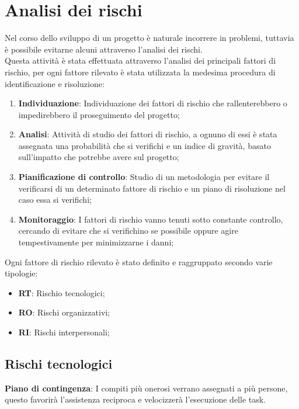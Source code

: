 \section{Analisi dei rischi}
\label{section:anal_rischi}
	Nel corso dello sviluppo di un progetto è naturale incorrere in problemi, tuttavia è possibile evitarne alcuni attraverso l'analisi dei rischi. \\ Questa attività è stata effettuata attraverso l'analisi dei principali fattori di rischio, per ogni fattore rilevato è stata utilizzata la medesima procedura di identificazione e risoluzione:
	\begin{enumerate}
		\item \textbf{Individuazione}: Individuazione dei fattori di rischio che rallenterebbero o impedirebbero il proseguimento del progetto;
		\item \textbf{Analisi}: Attività di studio dei fattori di rischio, a ognuno di essi è stata assegnata una probabilità che si verifichi e un indice di gravità, basato sull'impatto che potrebbe avere sul progetto;
		\item \textbf{Pianificazione di controllo}: Studio di un metodologia per evitare il verificarsi di un determinato fattore di rischio e un piano di risoluzione nel caso essa si verifichi;
		\item \textbf{Monitoraggio}: I fattori di rischio vanno tenuti sotto constante controllo, cercando di evitare che si verifichino se possibile oppure agire tempestivamente per minimizzarne i danni;
	\end{enumerate}
	Ogni fattore di rischio rilevato è stato definito e raggruppato secondo varie tipologie:
	\begin{itemize}
		\item \textbf{RT}: Rischio tecnologici;
		\item \textbf{RO}: Rischi organizzativi;
		\item \textbf{RI}: Rischi interpersonali;
	\end{itemize}
	\subsection{Rischi tecnologici}
	\def\productquality{
    		{
        		Inesperienza tecnologica RT1,
        		La maggior parte delle tecnologie richieste nello sviluppo del progetto sono nuove per molti componenti del team, 
        		Il responsabile dovrà rilevare conoscenze e lacune dei vari componenti del team provando a indicare una via ottimale per risolvere la mancanza di conoscenze,
        		Occorrenza: Alta 
			Pericolosità: Alta
    		},
	}
	
	\textbf{Piano di contingenza}: I compiti più onerosi verrano assegnati a più persone, questo favorirà l'assistenza reciproca e velocizzerà l'esecuzione delle task.
	\pagebreak

